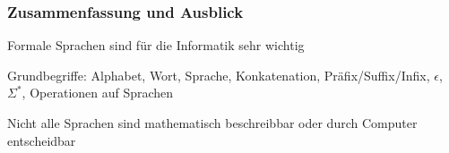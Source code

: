 \documentclass[onlymath]{beamer}
\begin{document}
\begin{frame}\frametitle{Zusammenfassung und Ausblick}

Formale Sprachen sind für die Informatik sehr wichtig
\bigskip

Grundbegriffe: Alphabet, Wort, Sprache, Konkatenation, Präfix/Suffix/Infix, $\epsilon$, $\Sigma^*$, Operationen auf Sprachen
\bigskip

Nicht alle Sprachen sind mathematisch beschreibbar oder durch Computer entscheidbar
\bigskip


\end{frame}
\end{document}

